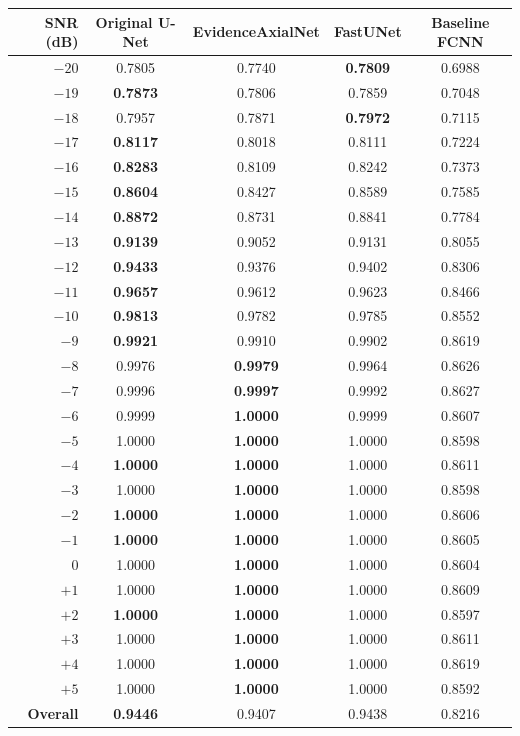 \documentclass[10pt]{article}
\begin{document}
\begin{table}[ht]
\centering
\label{tab:snr-f1}
\small
\renewcommand{\arraystretch}{1.12}
\setlength{\tabcolsep}{9pt}
\begin{tabular}{rcccc}
\toprule
\rowcolor{headerblue}
\textbf{SNR (dB)} &
\textbf{Original U-Net} &
\textbf{EvidenceAxialNet} &
\textbf{FastUNet} &
\textbf{Baseline FCNN} \\
\midrule
$-20$ & 0.7805 & 0.7740 & \textbf{0.7809} & 0.6988 \\
$-19$ & \textbf{0.7873} & 0.7806 & 0.7859 & 0.7048 \\
$-18$ & 0.7957 & 0.7871 & \textbf{0.7972} & 0.7115 \\
$-17$ & \textbf{0.8117} & 0.8018 & 0.8111 & 0.7224 \\
$-16$ & \textbf{0.8283} & 0.8109 & 0.8242 & 0.7373 \\
$-15$ & \textbf{0.8604} & 0.8427 & 0.8589 & 0.7585 \\
$-14$ & \textbf{0.8872} & 0.8731 & 0.8841 & 0.7784 \\
$-13$ & \textbf{0.9139} & 0.9052 & 0.9131 & 0.8055 \\
$-12$ & \textbf{0.9433} & 0.9376 & 0.9402 & 0.8306 \\
$-11$ & \textbf{0.9657} & 0.9612 & 0.9623 & 0.8466 \\
$-10$ & \textbf{0.9813} & 0.9782 & 0.9785 & 0.8552 \\
$-9$  & \textbf{0.9921} & 0.9910 & 0.9902 & 0.8619 \\
$-8$  & 0.9976 & \textbf{0.9979} & 0.9964 & 0.8626 \\
$-7$  & 0.9996 & \textbf{0.9997} & 0.9992 & 0.8627 \\
$-6$  & 0.9999 & \textbf{1.0000} & 0.9999 & 0.8607 \\
$-5$  & 1.0000 & \textbf{1.0000} & 1.0000 & 0.8598 \\
$-4$  & \textbf{1.0000} & \textbf{1.0000} & 1.0000 & 0.8611 \\
$-3$  & 1.0000 & \textbf{1.0000} & 1.0000 & 0.8598 \\
$-2$  & \textbf{1.0000} & \textbf{1.0000} & 1.0000 & 0.8606 \\
$-1$  & \textbf{1.0000} & \textbf{1.0000} & 1.0000 & 0.8605 \\
$0$   & 1.0000 & \textbf{1.0000} & 1.0000 & 0.8604 \\
$+1$  & 1.0000 & \textbf{1.0000} & 1.0000 & 0.8609 \\
$+2$  & \textbf{1.0000} & \textbf{1.0000} & 1.0000 & 0.8597 \\
$+3$  & 1.0000 & \textbf{1.0000} & 1.0000 & 0.8611 \\
$+4$  & 1.0000 & \textbf{1.0000} & 1.0000 & 0.8619 \\
$+5$  & 1.0000 & \textbf{1.0000} & 1.0000 & 0.8592 \\
\midrule
\rowcolor{lightgray}
\textbf{Overall} &
\textbf{0.9446} &
0.9407 &
0.9438 &
0.8216 \\
\bottomrule
\end{tabular}

\vspace{4pt}
\end{table}
\end{document}
